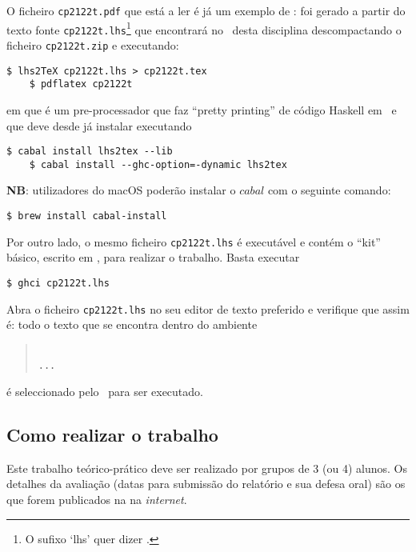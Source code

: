 \documentclass[a4paper]{article}
\newcommand{\Varid}[1]{\mathit{#1}}
\begin{document}
O ficheiro \texttt{cp2122t.pdf} que está a ler é já um exemplo de
: foi gerado a partir do texto fonte
\texttt{cp2122t.lhs}\footnote{O sufixo `lhs' quer dizer
\emph{}.} que encontrará no
\MaterialPedagogico\ desta disciplina descompactando o ficheiro
\texttt{cp2122t.zip} e executando:
\begin{Verbatim}[fontsize=\small]
    $ lhs2TeX cp2122t.lhs > cp2122t.tex
    $ pdflatex cp2122t
\end{Verbatim}
em que \href{https://hackage.haskell.org/package/lhs2tex}{\texttt\LhsToTeX} é
um pre-processador que faz ``pretty printing''
de código Haskell em \Latex\ e que deve desde já instalar executando
\begin{Verbatim}[fontsize=\small,commandchars=\\\{\}]
    $ cabal install lhs2tex --lib
    $ cabal install --ghc-option=-dynamic lhs2tex
\end{Verbatim}
\textbf{NB}: utilizadores do macOS poderão instalar o \ensuremath{\Varid{cabal}} com o seguinte comando:
\begin{Verbatim}[fontsize=\small,commandchars=\\\{\}]
    $ brew install cabal-install
\end{Verbatim}
Por outro lado, o mesmo ficheiro \texttt{cp2122t.lhs} é executável e contém
o ``kit'' básico, escrito em \Haskell, para realizar o trabalho. Basta executar
\begin{Verbatim}[fontsize=\small]
    $ ghci cp2122t.lhs
\end{Verbatim}

\noindent Abra o ficheiro \texttt{cp2122t.lhs} no seu editor de texto preferido
e verifique que assim é: todo o texto que se encontra dentro do ambiente
\begin{quote}\small\tt
{}
\\ ... \\
\end{quote}
é seleccionado pelo \GHCi\ para ser executado.

\subsection{Como realizar o trabalho}
Este trabalho teórico-prático deve ser realizado por grupos de 3 (ou 4) alunos.
Os detalhes da avaliação (datas para submissão do relatório e sua defesa
oral) são os que forem publicados na  na \emph{internet}.
\end{document}
